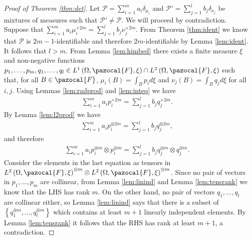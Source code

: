 \documentclass[aos,preprint]{imsart}
\def\sF{\pazocal{F}}
\def\sP{\mathscr{P}}
\theoremstyle{plain}
\theoremstyle{defintion}
\begin{document}
	\begin{proof}[Proof of Theorem \ref{thm:det}]
		Let $\sP = \sum_{i=1}^m a_i \delta_{\mu_i}$ and $\sP' = \sum_{j=1}^{l}  b_j \delta_{\nu_j}$ be mixtures of measures such that $\sP' \neq \sP$. We will proceed by contradiction. Suppose that $\sum_{i=1}^m  a_i \mu_i^{\times 2m} = \sum_{j=1}^l b_j \nu_j^{\times 2m} $. From Theorem \ref{thm:ident} we know that $\sP$ is $2m-1$-identifiable and therefore $2m$-identifiable by Lemma \ref{lem:ident}. It follows that $l>m$. From Lemma \ref{lem:himbed} there exists a finite measure $\xi$ and non-negative functions $p_1,\ldots,p_m,q_1,\ldots,q_l \in L^1\left( \Omega, \sF, \xi \right)\cap L^2\left( \Omega, \sF, \xi \right)$ such that, for all $B\in \sF$, $\mu_i(B) = \int_B p_i d\xi$ and $\nu_j(B) = \int_B q_j d\xi$ for all $i,j$. Using Lemmas \ref{lem:radprod} and \ref{lem:inteq} we have
		\begin{eqnarray*}
			\sum_{i=1}^m a_i p_i^{\times 2m} = \sum_{j=1}^l b_j q_j^{\times 2m}.
		\end{eqnarray*}
		By Lemma \ref{lem:l2prod} we have
		\begin{eqnarray*}
			\sum_{i=1}^m a_i p_i^{\otimes 2m} = \sum_{j=1}^l b_j q_j^{\otimes 2m},
		\end{eqnarray*}
		and therefore
		\begin{eqnarray*}
			\sum_{i=1}^m a_i p_i^{\otimes m}\otimes p_i^{\otimes m} = \sum_{j=1}^l b_j q_j^{\otimes m}\otimes q_j^{\otimes m}.
		\end{eqnarray*}
		\sloppy Consider the elements in the last equation as tensors in $ {L^2\left( \Omega, \sF, \xi \right)}^{\otimes m} \otimes  {L^2\left( \Omega, \sF, \xi \right)}^{ \otimes m} $. Since no pair of vectors in $p_1,\ldots,p_m$ are collinear, from Lemma \ref{lem:linind} and Lemma \ref{lem:tensrank} we know that the LHS has rank $m$. On the other hand, no pair of vectors $q_1,\ldots,q_l$ are collinear either, so Lemma \ref{lem:linind} says that there is a subset of $\left\{q_1^{\otimes m},\ldots, q_l^{\otimes m}\right\}$ which contains at least $m+1$ linearly independent elements. By Lemma \ref{lem:tensrank} it follows that the RHS has rank at least $m+1$, a contradiction.
	\end{proof}
\end{document}
